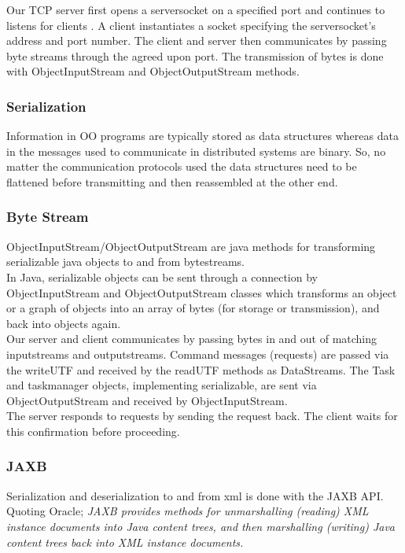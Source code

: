 Our TCP server first opens a serversocket on a specified port and continues to listens for clients . A client instantiates a socket specifying the serversocket's address and port number. The client and server then communicates by passing byte streams through the agreed upon port. The transmission of bytes is done with ObjectInputStream and ObjectOutputStream methods.  \\

\subsubsection{Serialization}
Information in OO programs are typically stored as data structures whereas data in the messages used to communicate in distributed systems are binary. So, no matter the communication protocols used the data structures need to be flattened before transmitting and then reassembled at the other end.



\subsubsection{Byte Stream}
ObjectInputStream/ObjectOutputStream are java methods for transforming serializable java objects to and from bytestreams. \\ 

In Java,  serializable objects can be sent through a connection by  ObjectInputStream and ObjectOutputStream classes which transforms an object or a graph of objects into an array of bytes (for storage or transmission), and back into objects again. \\

Our server and client communicates by passing bytes in and out of matching inputstreams and outputstreams. Command messages (requests) are passed via the writeUTF and received by the readUTF methods as DataStreams. The Task and taskmanager objects, implementing serializable, are sent via ObjectOutputStream and received by ObjectInputStream. \\

The server responds to requests by sending the request back. The client waits for this confirmation before proceeding. \\

\subsubsection{JAXB}
Serialization and deserialization to and from xml is done with the JAXB API. Quoting Oracle; \textit{JAXB provides methods for unmarshalling (reading) XML instance documents into Java content trees, and then marshalling (writing) Java content trees back into XML instance documents.} \\

